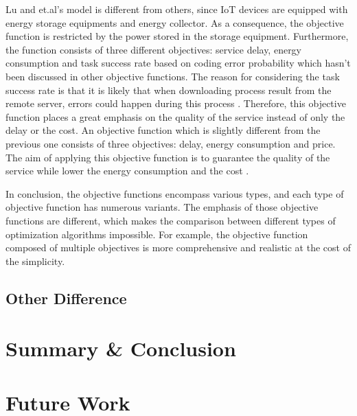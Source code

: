 \documentclass[a4paper,11pt]{article}
\begin{document}
Lu and et.al's model is different from others, since IoT devices are equipped with energy storage equipments and energy collector. As a consequence, the objective function is restricted by the power stored in the storage equipment. Furthermore, the function consists of three different objectives: service delay, energy consumption and task success rate based on coding error probability which hasn't been discussed in other objective functions. The reason for considering the task success rate is that it is likely that when downloading process result from the remote server, errors could happen during this process 
\cite{energy_objective}. Therefore, this objective function places a great emphasis on the quality of the service instead of only the delay or the cost. An objective function which is slightly different from the previous one consists of three objectives: delay, energy consumption and price. The aim of applying this objective function is to guarantee the quality of the service while lower the energy consumption and the cost \cite{user_central}. \newline

In conclusion, the objective functions encompass various types, and each type of objective function has numerous variants. The emphasis of those objective functions are different, which makes the comparison between different types of optimization algorithms impossible. For example, the objective function composed of multiple objectives is more comprehensive and realistic at the cost of the simplicity. 





\subsection{Other Difference}


\section{Summary \& Conclusion}

% 

\section{Future Work}



\small
\end{document}
